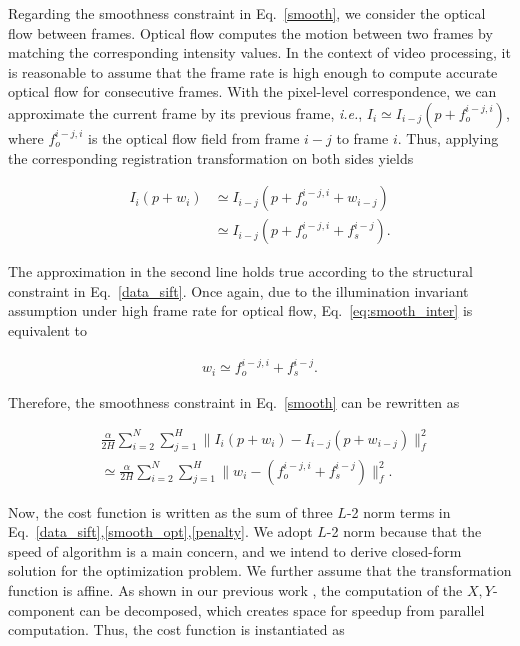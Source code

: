 \documentclass[10pt,journal]{IEEEtran}
\begin{document}
Regarding the smoothness constraint in Eq.~\eqref{smooth}, we consider the optical flow between frames. Optical flow computes the motion between two frames by matching the corresponding intensity values. In the context of video processing, it is reasonable to assume that the frame rate is high enough to compute accurate optical flow for consecutive frames. With the pixel-level correspondence, we can approximate the current frame by its previous frame, \textit{i.e.}, $I_i\simeq I_{i-j}(p+f_o^{i-j,i})$, where $f_o^{i-j,i}$ is the optical flow field from frame $i-j$ to frame $i$. Thus, applying the corresponding registration transformation on both sides yields

\begin{align}
\label{eq:smooth_inter}
I_i(p+w_i)& \simeq I_{i-j}(p+f_o^{i-j,i}+w_{i-j}) \nonumber \\
					& \simeq I_{i-j}(p+f_o^{i-j,i}+f_s^{i-j}).
\end{align}

The approximation in the second line holds true according to the structural constraint in Eq.~\eqref{data_sift}. Once again, due to the illumination invariant assumption under high frame rate for optical flow, Eq.~\eqref{eq:smooth_inter} is equivalent to

\begin{align}
w_i \simeq f_o^{i-j,i}+f_s^{i-j}.	\nonumber
\end{align}

Therefore, the smoothness constraint in Eq.~\eqref{smooth} can be rewritten as

\begin{align}
\label{smooth_opt}
&\frac{\alpha}{2H}\sum_{i=2}^{N}\sum_{j=1}^{H}\parallel{I_i(p+w_i)-I_{i-j}(p+w_{i-j})}\parallel_f^2 \nonumber \\
&\simeq\frac{\alpha}{2H}\sum_{i=2}^{N}\sum_{j=1}^{H}\parallel{w_i-(f_o^{i-j,i}+f_s^{i-j})}\parallel_f^2.
\end{align}


Now, the cost function is written as the sum of three $L$-2 norm terms in Eq.~\eqref{data_sift},\ref{smooth_opt},\ref{penalty}. We adopt $L$-2 norm because that the speed of algorithm is a main concern, and we intend to derive closed-form solution for the optimization problem. We further assume that the transformation function is affine. As shown in our previous work \cite{Yang_FG13}, the computation of the $X,Y$-component can be decomposed, which creates space for speedup from parallel computation. Thus, the cost function is instantiated as
\end{document}
